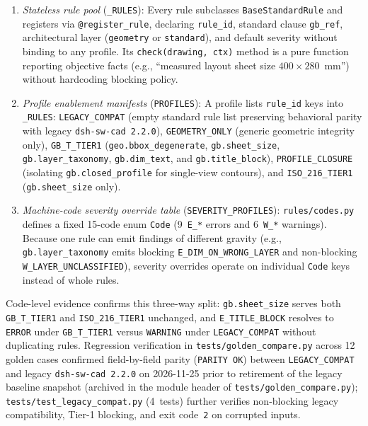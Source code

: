 \documentclass[nocopyright,nolists,upint,varvw,hyphenate]{asmejour}
\begin{document}
\begin{enumerate}
\item \emph{Stateless rule pool} (\texttt{\_RULES}): Every rule subclasses \texttt{BaseStandardRule} and registers via \texttt{@register\_rule}, declaring \texttt{rule\_id}, standard clause \texttt{gb\_ref}, architectural layer (\texttt{geometry} or \texttt{standard}), and default severity without binding to any profile. Its \texttt{check(drawing, ctx)} method is a pure function reporting objective facts (e.g., ``measured layout sheet size $400 \times 280$~mm'') without hardcoding blocking policy.
\item \emph{Profile enablement manifests} (\texttt{PROFILES}): A profile lists \texttt{rule\_id} keys into \texttt{\_RULES}: \texttt{LEGACY\_\allowbreak COMPAT} (empty standard rule list preserving behavioral parity with legacy \texttt{dsh-sw-cad 2.2.0}), \texttt{GEOMETRY\_\allowbreak ONLY} (generic geometric integrity only), \texttt{GB\_T\_\allowbreak TIER1} (\texttt{geo.\allowbreak bbox\_\allowbreak degenerate}, \texttt{gb.\allowbreak sheet\_\allowbreak size}, \texttt{gb.\allowbreak layer\_\allowbreak taxonomy}, \texttt{gb.\allowbreak dim\_text}, and \texttt{gb.\allowbreak title\_block}), \texttt{PROFILE\_\allowbreak CLOSURE} (isolating \texttt{gb.\allowbreak closed\_\allowbreak profile} for single-view contours), and \texttt{ISO\_216\_\allowbreak TIER1} (\texttt{gb.\allowbreak sheet\_\allowbreak size} only).
\item \emph{Machine-code severity override table} (\texttt{SEVERITY\_\allowbreak PROFILES}): \texttt{rules/\allowbreak codes.py} defines a fixed 15-code enum \texttt{Code} (9~\texttt{E\_*} errors and 6~\texttt{W\_*} warnings). Because one rule can emit findings of different gravity (e.g., \texttt{gb.\allowbreak layer\_\allowbreak taxonomy} emits blocking \texttt{E\_DIM\_\allowbreak ON\_WRONG\_\allowbreak LAYER} and non-blocking \texttt{W\_LAYER\_\allowbreak UNCLASSIFIED}), severity overrides operate on individual \texttt{Code} keys instead of whole rules.
\end{enumerate}

Code-level evidence confirms this three-way split: \texttt{gb.\allowbreak sheet\_\allowbreak size} serves both \texttt{GB\_T\_\allowbreak TIER1} and \texttt{ISO\_216\_\allowbreak TIER1} unchanged, and \texttt{E\_TITLE\_\allowbreak BLOCK} resolves to \texttt{ERROR} under \texttt{GB\_T\_\allowbreak TIER1} versus \texttt{WARNING} under \texttt{LEGACY\_\allowbreak COMPAT} without duplicating rules. Regression verification in \texttt{tests/\allowbreak golden\_\allowbreak compare.py} across 12 golden cases confirmed field-by-field parity (\texttt{PARITY OK}) between \texttt{LEGACY\_\allowbreak COMPAT} and legacy \texttt{dsh-sw-cad 2.2.0} on 2026-11-25 prior to retirement of the legacy baseline snapshot (archived in the module header of \texttt{tests/\allowbreak golden\_\allowbreak compare.py}); \texttt{tests/\allowbreak test\_\allowbreak legacy\_\allowbreak compat.py} (4~tests) further verifies non-blocking legacy compatibility, Tier-1 blocking, and exit code~\texttt{2} on corrupted inputs.
\end{document}
